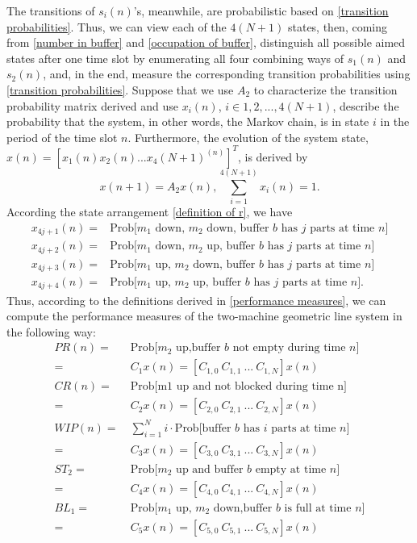 The transitions of $s_i(n)$'s, meanwhile, are probabilistic based on \ref{transition probabilities}. Thus, we can view each of the $4(N+1)$ states, then, coming from \ref{number in buffer} and \ref{occupation of buffer}, distinguish all possible aimed states after one time slot by enumerating all four combining ways of $s_1(n)$ and $s_2(n)$, and, in the end, measure the corresponding transition probabilities using \ref{transition probabilities}. Suppose that we use $A_2$ to characterize the transition probability matrix derived and use $x_i(n)$, $i\in {1,2,...,4(N+1)}$, describe the probability that the system, in other words, the Markov chain, is in state $i$ in the period of the time slot $n$. Furthermore, the evolution of the system state, $x(n)=[x_1(n)x_2(n)...x_4(N+1)^{(n)}]^T$, is derived by
\begin{equation}
	x(n+1) = A_2x(n), \sum_{i=1}^{4(N+1)} x_i(n) = 1 .
\end{equation}
According the state arrangement \ref{definition of r}, we have
\begin{equation}
	\begin{aligned}
		x_{4j+1}(n)=&\text{Prob[$m_1$ down, $m_2$ down, buffer $b$ has $j$ parts at time $n$]}  \\
		x_{4j+2}(n)=&\text{Prob[$m_1$ down, $m_2$ up, buffer $b$ has $j$ parts at time $n$]}  \\
		x_{4j+3}(n)=&\text{Prob[$m_1$ up, $m_2$ down, buffer $b$ has $j$ parts at time $n$]} \\
		x_{4j+4}(n)=&\text{Prob[$m_1$ up, $m_2$ up, buffer $b$ has $j$ parts at time $n$]}.
	\end{aligned}
\end{equation}
Thus, according to the definitions derived in \ref{performance measures}, we can compute the performance measures of the two-machine geometric line system in the following way:
\begin{equation}
	\begin{aligned}
		PR(n)=&\  \text{Prob[$m_2$ up,buffer $b$ not empty during time $n$] }\\
		=&\ C_1x(n)=[C_{1,0}\ C_{1,1}\ ...\ C_{1,N}]x(n) \\
		CR(n)=&\ \text{Prob[m1 up and not blocked during time n]} \\
		=&\ C_2x(n)=[C_{2,0}\ C_{2,1}\ ...\ C_{2,N}]x(n)\\
		WIP(n)=&\ \sum_{i=1}^N i \cdot \text{Prob[buffer $b$ has $i$ parts at time $n$]} \\
		=&\ C_3x(n)=[C_{3,0}\ C_{3,1}\ ...\ C_{3,N}]x(n) \\
		ST_2=&\ \text{Prob[$m_2$ up and buffer $b$ empty at time $n$]} \\
		=&\ C_4x(n)=[C_{4,0}\ C_{4,1}\ ...\ C_{4,N}]x(n) \\
		BL_1=&\ \text{Prob[$m_1$ up, $m_2$ down,buffer $b$ is full at time $n$]} \\
		=&\  C_5x(n)=[C_{5,0}\ C_{5,1}\ ...\ C_{5,N}]x(n)
	\end{aligned}
\end{equation}
